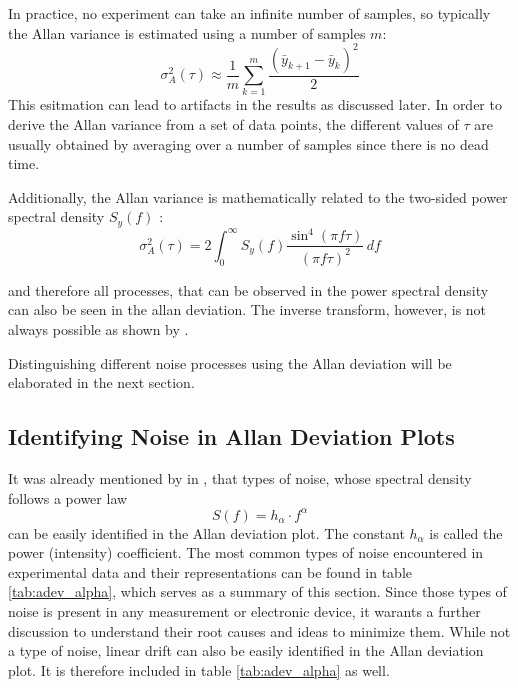 In practice, no experiment can take an infinite number of samples, so typically the Allan variance is estimated using a number of samples $m$:
\begin{equation}
    \sigma_A^2(\tau) \approx \frac1 m \sum_{k=1}^m \frac{\left(\bar y_{k+1} - \bar y_{k} \right)^2}{2} \label{eqn:adev_estimator}
\end{equation}
This esitmation can lead to artifacts in the results as discussed later. In order to derive the Allan variance from a set of data points, the different values of $\tau$ are usually obtained by averaging over a number of samples since there is no dead time.

Additionally, the Allan variance is mathematically related to the two-sided power spectral density $S_y(f)$ \cite{psd_to_adev}:
\begin{equation}
    \sigma_A^2(\tau) = 2 \int_0^\infty S_y(f) \frac{\sin^4\left( \pi f \tau \right)}{(\pi f \tau)^2}\,df \label{eqn:psd_to_adev}
\end{equation}

and therefore all processes, that can be observed in the power spectral density can also be seen in the allan deviation. The inverse transform, however, is not always possible as shown by \citeauthor{inverse_adev} \cite{inverse_adev}.

Distinguishing different noise processes using the Allan deviation will be elaborated in the next section.

\subsection{Identifying Noise in Allan Deviation Plots}
It was already mentioned by \citeauthor{adev} in \cite{adev}, that types of noise, whose spectral density follows a power law
\begin{equation}
    S(f) = h_{\alpha} \cdot f^\alpha \label{eqn:power_law}
\end{equation}
can be easily identified in the Allan deviation plot. The constant $h_\alpha$ is called the power (intensity) coefficient. The most common types of noise encountered in experimental data and their representations can be found in table \ref{tab:adev_alpha}, which serves as a summary of this section. Since those types of noise is present in any measurement or electronic device, it warants a further discussion to understand their root causes and ideas to minimize them. While not a type of noise, linear drift can also be easily identified in the Allan deviation plot. It is therefore included in table \ref{tab:adev_alpha} as well.

